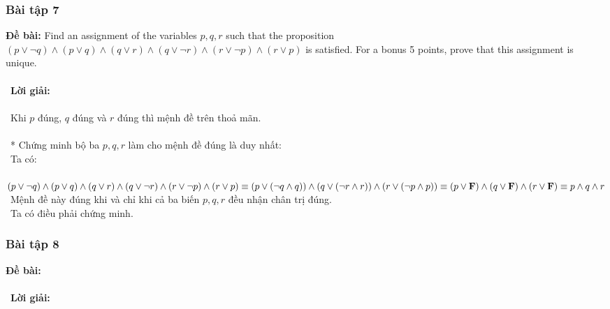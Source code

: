 \documentclass[a4paper]{article}
\begin{document}
\subsubsection{Bài tập 7}
\textbf{Đề bài: }Find an assignment of the variables $p, q, r$ such that the proposition $(p \lor \lnot q) \land (p \lor q) \land (q \lor r) \land (q \lor \lnot r) \land (r \lor \lnot p) \land (r \lor p)$ is satisfied. For a bonus 5 points, prove that this assignment is unique. \\\ \\\
\textbf{Lời giải:} \\\ \\\
Khi $p$ đúng, $q$ đúng và $r$ đúng thì mệnh đề trên thoả mãn. \\\ \\\
* Chứng minh bộ ba $p,q,r$ làm cho mệnh đề đúng là duy nhất: \\\
Ta có: \\\
$(p \lor \lnot q) \land (p \lor q) \land (q \lor r) \land (q \lor \lnot r) \land (r \lor \lnot p) \land (r \lor p) \\\equiv  (p \lor (\lnot q \land q)) \land (q \lor (\lnot r \land r)) \land (r \lor (\lnot p \land p))\\\equiv (p \lor \textbf{F}) \land (q \lor \textbf{F}) \land (r \lor \textbf{F}) \\\equiv p \land q \land r$ \\\
Mệnh đề này đúng khi và chỉ khi cả ba biến $p,q,r$ đều nhận chân trị đúng. \\\
Ta có điều phải chứng minh.
\clearpage
\subsubsection{Bài tập 8}
\textbf{Đề bài:} 
\\\ \\\
\textbf{Lời giải:} \\\ \\\
\clearpage
\end{document}

